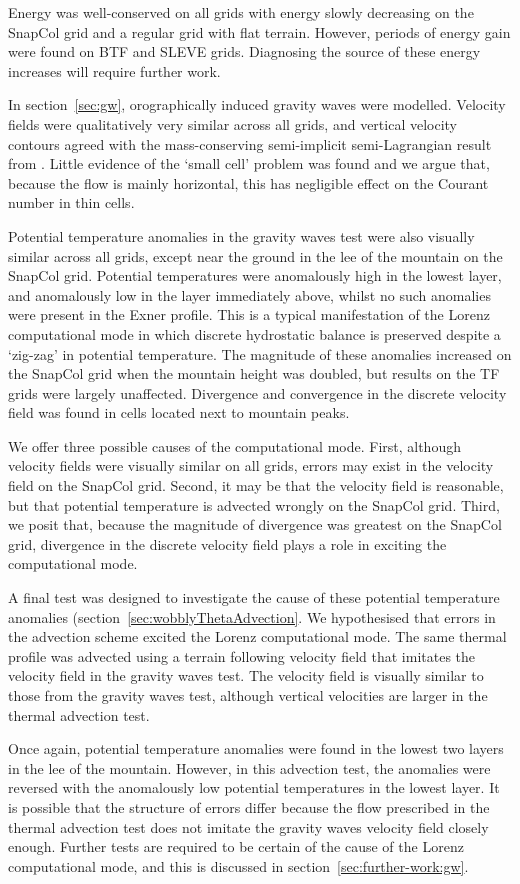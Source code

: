 Energy was well-conserved on all grids with energy slowly decreasing on the SnapCol grid and a regular grid with flat terrain.  However, periods of energy gain were found on BTF and SLEVE grids.  Diagnosing the source of these energy increases will require further work.

In section~\ref{sec:gw}, orographically induced gravity waves were modelled.  Velocity fields were qualitatively very similar across all grids, and vertical velocity contours agreed with the mass-conserving semi-implicit semi-Lagrangian result from \textcite{melvin2010}.  Little evidence of the `small cell' problem was found and we argue that, because the flow is mainly horizontal, this has negligible effect on the Courant number in thin cells.

Potential temperature anomalies in the gravity waves test were also visually similar across all grids, except near the ground in the lee of the mountain on the SnapCol grid.  Potential temperatures were anomalously high in the lowest layer, and anomalously low in the layer immediately above, whilst no such anomalies were present in the Exner profile.
This is a typical manifestation of the Lorenz computational mode in which discrete hydrostatic balance is preserved despite a `zig-zag' in potential temperature.
The magnitude of these anomalies increased on the SnapCol grid when the mountain height was doubled, but results on the TF grids were largely unaffected.  Divergence and convergence in the discrete velocity field was found in cells located next to mountain peaks.  

We offer three possible causes of the computational mode.  First, although velocity fields were visually similar on all grids, errors may exist in the velocity field on the SnapCol grid.  Second, it may be that the velocity field is reasonable, but that potential temperature is advected wrongly on the SnapCol grid.  Third, we posit that, because the magnitude of divergence was greatest on the SnapCol grid, divergence in the discrete velocity field plays a role in exciting the computational mode.

A final test was designed to investigate the cause of these potential temperature anomalies (section~\ref{sec:wobblyThetaAdvection}.  We hypothesised that errors in the advection scheme excited the Lorenz computational mode.  The same thermal profile was advected using a terrain following velocity field that imitates the velocity field in the gravity waves test.  The velocity field is visually similar to those from the gravity waves test, although vertical velocities are larger in the thermal advection test.

Once again, potential temperature anomalies were found in the lowest two layers in the lee of the mountain.  However, in this advection test, the anomalies were reversed with the anomalously low potential temperatures in the lowest layer.  It is possible that the structure of errors differ because the flow prescribed in the thermal advection test does not imitate the gravity waves velocity field closely enough.  Further tests are required to be certain of the cause of the Lorenz computational mode, and this is discussed in section~\ref{sec:further-work:gw}.
